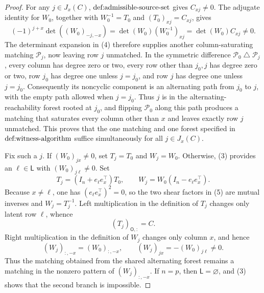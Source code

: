 \documentclass{article}
\begin{document}
\begin{proof}
For any \(j\in J_x(C)\), \(\textnormal{def:admissible-source-set}\) gives \(C_{xj}\ne0\).  The adjugate identity for \(W_0\), together with \(W_0^{-1}=T_0\) and \((T_0)_{xj}=C_{xj}\), gives
\[
 (-1)^{j+x}\det((W_0)_{-j,-x})
 =\det(W_0)(W_0^{-1})_{xj}
 =\det(W_0)C_{xj}\ne0.                                                      \tag{4}
\]
The determinant expansion in (4) therefore supplies another column-saturating matching \(\mathcal P_j\), now leaving row \(j\) unmatched.  In the symmetric difference \(\mathcal P_0\mathbin{\triangle}\mathcal P_j\), every column has degree zero or two, every row other than \(j_0,j\) has degree zero or two, row \(j_0\) has degree one unless \(j=j_0\), and row \(j\) has degree one unless \(j=j_0\).  Consequently its noncyclic component is an alternating path from \(j_0\) to \(j\), with the empty path allowed when \(j=j_0\).  Thus \(j\) is in the alternating-reachability forest rooted at \(j_0\), and flipping \(\mathcal P_0\) along this path produces a matching that saturates every column other than \(x\) and leaves exactly row \(j\) unmatched.  This proves that the one matching and one forest specified in \(\textnormal{def:witness-algorithm}\) suffice simultaneously for all \(j\in J_x(C)\).

Fix such a \(j\).  If \((W_0)_{jx}\ne0\), set \(T_j=T_0\) and \(W_j=W_0\).  Otherwise, (3) provides an \(\ell\in\mathsf L\) with \((W_0)_{j\ell}\ne0\).  Set
\[
 T_j=(I_n+e_\ell e_x^\top)T_0,
 \qquad
 W_j=W_0(I_n-e_\ell e_x^\top).                                             \tag{5}
\]
Because \(x\ne\ell\), one has \((e_\ell e_x^\top)^2=0\), so the two shear factors in (5) are mutual inverses and \(W_j=T_j^{-1}\).  Left multiplication in the definition of \(T_j\) changes only latent row \(\ell\), whence
\[
 (T_j)_{\mathsf O,:}=C.                                                     \tag{6}
\]
Right multiplication in the definition of \(W_j\) changes only column \(x\), and hence
\[
 (W_j)_{:,-x}=(W_0)_{:,-x},
 \qquad
 (W_j)_{jx}=-(W_0)_{j\ell}\ne0.                                            \tag{7}
\]
Thus the matching obtained from the shared alternating forest remains a matching in the nonzero pattern of \((W_j)_{:,-x}\).  If \(n=p\), then \(\mathsf L=\varnothing\), and (3) shows that the second branch is impossible.


\end{proof}
\end{document}
